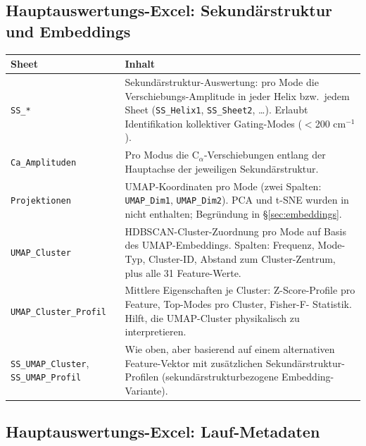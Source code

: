 \documentclass[11pt,a4paper,twoside]{article}
\theoremstyle{remark}
\begin{document}
\subsection{Hauptauswertungs-Excel: Sekund\"arstruktur und Embeddings}

\begin{longtable}{p{} p{}}
\toprule
\textbf{Sheet} & \textbf{Inhalt} \\
\midrule
\endhead

\texttt{SS\_*} & Sekund\"arstruktur-Auswertung: pro Mode die
  Verschiebungs-Amplitude in jeder Helix bzw.\ jedem Sheet
  (\texttt{SS\_Helix1}, \texttt{SS\_Sheet2}, \ldots). Erlaubt
  Identifikation kollektiver Gating-Modes ($<$200 cm$^{-1}$). \\

\texttt{Ca\_Amplituden} & Pro Modus die C$_\alpha$-Verschiebungen
  entlang der Hauptachse der jeweiligen Sekund\"arstruktur. \\

\texttt{Projektionen} & UMAP-Koordinaten pro Mode (zwei Spalten:
  \texttt{UMAP\_Dim1}, \texttt{UMAP\_Dim2}). PCA und t-SNE wurden in
  nicht enthalten; Begr\"undung in \S\ref{sec:embeddings}. \\

\texttt{UMAP\_Cluster} & HDBSCAN-Cluster-Zuordnung pro Mode auf
  Basis des UMAP-Embeddings. Spalten: Frequenz, Mode-Typ,
  Cluster-ID, Abstand zum Cluster-Zentrum, plus alle 31
  Feature-Werte. \\

\texttt{UMAP\_Cluster\_Profil} & Mittlere Eigenschaften je Cluster:
  Z-Score-Profile pro Feature, Top-Modes pro Cluster, Fisher-F-
  Statistik. Hilft, die UMAP-Cluster physikalisch zu interpretieren. \\

\texttt{SS\_UMAP\_Cluster}, \texttt{SS\_UMAP\_Profil} & Wie oben, aber
  basierend auf einem alternativen Feature-Vektor mit zus\"atzlichen
  Sekund\"arstruktur-Profilen (sekund\"arstrukturbezogene Embedding-
  Variante). \\
\bottomrule
\end{longtable}

\subsection{Hauptauswertungs-Excel: Lauf-Metadaten}
\end{document}
